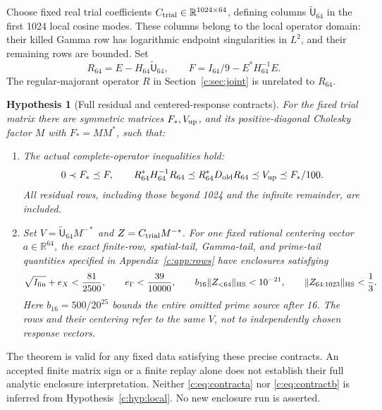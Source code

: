 \documentclass[11pt,a4paper]{article}
\numberwithin{equation}{section}
\newtheorem{hypothesis}[theorem]{Hypothesis}
\theoremstyle{definition}\newtheorem{definition}[theorem]{Definition}
\theoremstyle{remark}\newtheorem{remark}[theorem]{Remark}
\newcommand{\R}{\mathbb R}\newcommand{\C}{\mathbb C}\newcommand{\N}{\mathbb N}
\begin{document}
Choose fixed real trial coefficients $C_{\rm trial}\in\R^{1024\times64}$,
defining columns $\widetilde{\mathsf U}_{64}$ in the first 1024 local cosine modes.
These columns belong to the local operator domain: their killed Gamma row has logarithmic endpoint singularities in $L^2$, and their remaining rows are bounded.
Set
\[
 R_{64}=E-H_{64}\widetilde{\mathsf U}_{64},\qquad
 F=I_{64}/9-E^*H_{64}^{-1}E.
\]
The regular-majorant operator $R$ in Section~\ref{c:sec:joint} is unrelated to $R_{64}$.

\begin{hypothesis}[Full residual and centered-response contracts]\label{c:hyp:response}
For the fixed trial matrix there are symmetric matrices $F_*,V_{\rm up}$,
and its positive-diagonal Cholesky factor $M$ with $F_*=MM^*$, such that:
\begin{enumerate}[label=\textup{(\alph*)}]
\item The actual complete-operator inequalities hold:
\begin{equation}\label{c:eq:contracta}
 0\prec F_*\preceq F,\qquad
 R_{64}^*H_{64}^{-1}R_{64}
 \preceq R_{64}^*D_{\rm old}R_{64}
 \preceq V_{\rm up}\preceq F_*/100.
\end{equation}
All residual rows, including those beyond 1024 and the infinite remainder, are included.
\item Set $V=\widetilde{\mathsf U}_{64} M^{-*}$ and $Z=C_{\rm trial}M^{-*}$.
For one fixed rational centering vector $a\in\R^{64}$, the exact finite-row, spatial-tail, Gamma-tail, and prime-tail quantities specified in Appendix~\ref{c:app:rows} have enclosures satisfying
\begin{equation}\label{c:eq:contractb}
 \sqrt{I_{\rm fin}}+e_X<\frac{81}{2500},\qquad
 e_\Gamma<\frac{39}{10000},\qquad
 b_{16}\lVert Z_{<64}\rVert_{\mathrm{HS}}<10^{-21},\qquad
 \lVert Z_{64:1023}\rVert_{\mathrm{HS}}<\frac13.
\end{equation}
Here $b_{16}=500/20^{25}$ bounds the entire omitted prime source after 16.
The rows and their centering refer to the same $V$, not to independently chosen response vectors.
\end{enumerate}
\end{hypothesis}
The theorem is valid for any fixed data satisfying these precise contracts.
An accepted finite matrix sign or a finite replay alone does not establish their full analytic enclosure interpretation.
Neither \eqref{c:eq:contracta} nor \eqref{c:eq:contractb} is inferred from Hypothesis~\ref{c:hyp:local}.
No new enclosure run is asserted.
\end{document}
